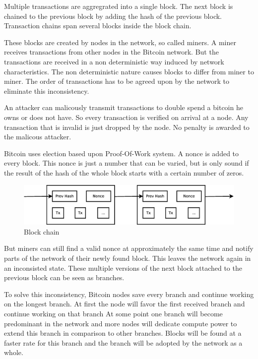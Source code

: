 Multiple transactions are aggregrated into a single block.
The next block is chained to the previous block by adding the hash of the previous block.
Transaction chains span several blocks inside the block chain.

These blocks are created by nodes in the network, so called miners.
A miner receives transactions from other nodes in the Bitcoin network.
But the transactions are received in a non deterministic way induced by network characteristics.
The non deterministic nature causes blocks to differ from miner to miner.
The order of transactions has to be agreed upon by the network to eliminate this inconsistency.

An attacker can malicously transmit transactions to double spend a bitcoin he owns or does not have.
So every transaction is verified on arrival at a node.
Any transaction that is invalid is just dropped by the node.
No penalty is awarded to the malicous attacker.

Bitcoin uses election based upon Proof-Of-Work system.
A nonce is added to every block. 
This nonce is just a number that can be varied,
but is only sound if the result of the hash of the whole block starts with a certain number of zeros.

\begin{figure}[H]
        \centerline{\includegraphics[scale=0.3]{problemDescription/figs/blocks.eps}}
        \caption{Block chain}
\end{figure}

But miners can still find a valid nonce at approximately the same time
and notify parts of the network of their newly found block.
This leaves the network again in an inconsisted state.
These multiple versions of the next block attached to the previous block can be seen as branches.

To solve this inconsistency, Bitcoin nodes save every branch and continue working on the longest branch.
At first the node will favor the first received branch and continue working on that branch
At some point one branch will become predominant in the network
and more nodes will dedicate compute power to extend this branch in comparison to other branches.
Blocks will be found at a faster rate for this branch
and the branch will be adopted by the network as a whole.

